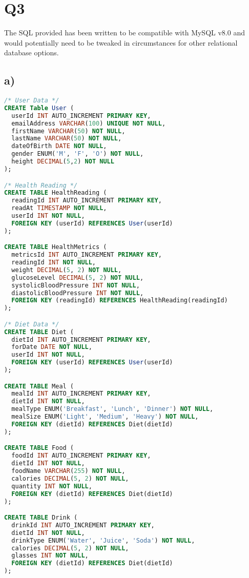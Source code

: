 \documentclass{article}
\begin{document}
\pagebreak

\section*{Q3}
The SQL provided has been written to be compatible with MySQL v8.0 and would potentially need to be tweaked in circumstances for other relational database options.
\vspace{-0.2cm}
\subsection*{\small a)}
\vspace{-0.3cm}
\begin{lstlisting}[language=sql]
/* User Data */
CREATE Table User (
  userId INT AUTO_INCREMENT PRIMARY KEY,
  emailAddress VARCHAR(100) UNIQUE NOT NULL,
  firstName VARCHAR(50) NOT NULL,
  lastName VARCHAR(50) NOT NULL,
  dateOfBirth DATE NOT NULL,
  gender ENUM('M', 'F', 'O') NOT NULL,
  height DECIMAL(5,2) NOT NULL
);

/* Health Reading */
CREATE TABLE HealthReading (
  readingId INT AUTO_INCREMENT PRIMARY KEY,
  readAt TIMESTAMP NOT NULL,
  userId INT NOT NULL,
  FOREIGN KEY (userId) REFERENCES User(userId)
);

CREATE TABLE HealthMetrics (
  metricsId INT AUTO_INCREMENT PRIMARY KEY,
  readingId INT NOT NULL,
  weight DECIMAL(5, 2) NOT NULL,
  glucoseLevel DECIMAL(5, 2) NOT NULL,
  systolicBloodPressure INT NOT NULL,
  diastolicBloodPressure INT NOT NULL,
  FOREIGN KEY (readingId) REFERENCES HealthReading(readingId)
);

/* Diet Data */
CREATE TABLE Diet (
  dietId INT AUTO_INCREMENT PRIMARY KEY,
  forDate DATE NOT NULL,
  userId INT NOT NULL,
  FOREIGN KEY (userId) REFERENCES User(userId)
);

CREATE TABLE Meal (
  mealId INT AUTO_INCREMENT PRIMARY KEY,
  dietId INT NOT NULL,
  mealType ENUM('Breakfast', 'Lunch', 'Dinner') NOT NULL,
  mealSize ENUM('Light', 'Medium', 'Heavy') NOT NULL,
  FOREIGN KEY (dietId) REFERENCES Diet(dietId)
);

CREATE TABLE Food (
  foodId INT AUTO_INCREMENT PRIMARY KEY,
  dietId INT NOT NULL,
  foodName VARCHAR(255) NOT NULL,
  calories DECIMAL(5, 2) NOT NULL,
  quantity INT NOT NULL,
  FOREIGN KEY (dietId) REFERENCES Diet(dietId)
);

CREATE TABLE Drink (
  drinkId INT AUTO_INCREMENT PRIMARY KEY,
  dietId INT NOT NULL,
  drinkType ENUM('Water', 'Juice', 'Soda') NOT NULL,
  calories DECIMAL(5, 2) NOT NULL,
  glasses INT NOT NULL,
  FOREIGN KEY (dietId) REFERENCES Diet(dietId)
);


\end{lstlisting}
\end{document}
